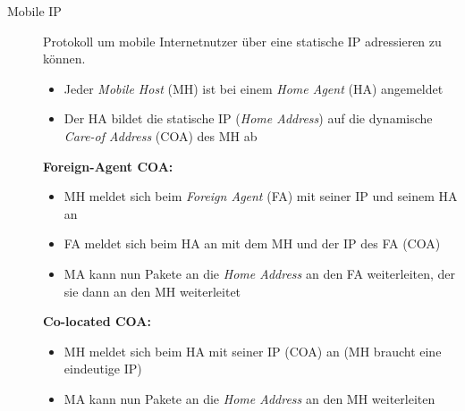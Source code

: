 \documentclass[a4paper]{article}
\begin{document}
\begin{description}
\begin{samepage}
\begin{enumerate}
    \end{enumerate}
    \end{samepage}
    \item[Mobile IP]
    \begin{samepage}
    Protokoll um mobile Internetnutzer über eine statische IP adressieren zu können.
    \begin{itemize}
        \item Jeder \textit{Mobile Host} (MH) ist bei einem \textit{Home Agent} (HA) angemeldet
        \item Der HA bildet die statische IP (\textit{Home Address}) auf die dynamische \textit{Care-of Address} (COA) des MH ab
    \end{itemize}
    \textbf{Foreign-Agent COA:}
    \begin{itemize}
        \item MH meldet sich beim \textit{Foreign Agent} (FA) mit seiner IP und seinem HA an
        \item FA meldet sich beim HA an mit dem MH und der IP des FA (COA)
        \item MA kann nun Pakete an die \textit{Home Address} an den FA weiterleiten, der sie dann an den MH weiterleitet
    \end{itemize}
    \textbf{Co-located COA:}
    \begin{itemize}
        \item MH meldet sich beim HA mit seiner IP (COA) an (MH braucht eine eindeutige IP)
        \item MA kann nun Pakete an die \textit{Home Address} an den MH weiterleiten
    \end{itemize}
    \end{samepage}
\end{description}
\end{document}
